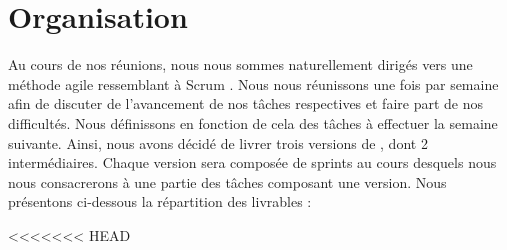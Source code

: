 \section{Organisation}
	\label{sec:livrables}

	Au cours de nos réunions, nous nous sommes naturellement dirigés vers une méthode agile ressemblant à \og Scrum \fg. Nous nous réunissons une fois par semaine afin de discuter de l'avancement de nos tâches respectives et faire part de nos difficultés. Nous définissons en fonction de cela des tâches à effectuer la semaine suivante. Ainsi, nous avons décidé de livrer trois versions de \glasir{}, dont 2 intermédiaires.
	Chaque version sera composée de sprints au cours desquels nous nous consacrerons à une partie des tâches composant une version. %
	Nous présentons ci-dessous la répartition des livrables :
	
<<<<<<< HEAD


